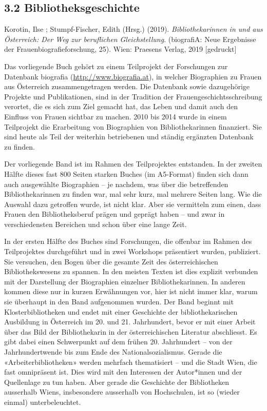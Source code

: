\documentclass[a4paper,
fontsize=11pt,
oneside,
numbers=noperiodatend,
parskip=half-,
bibliography=totoc,
final
]{scrartcl}
\begin{document}
\hypertarget{bibliotheksgeschichte}{%
\subsection{3.2 Bibliotheksgeschichte}\label{bibliotheksgeschichte}}

Korotin, Ilse ; Stumpf-Fischer, Edith (Hrsg.) (2019).
\emph{Bibliothekarinnen in und aus Österreich: Der Weg zur beruflichen
Gleichstellung}. (biografiA: Neue Ergebnisse der
Frauenbiografieforschung, 25). Wien: Praesens Verlag, 2019
{[}gedruckt{]}

Das vorliegende Buch gehört zu einem Teilprojekt der Forschungen zur
Datenbank biografia
(\href{http://www.biografia.at/}{http://www.biografia.at}), in welcher
Biographien zu Frauen aus Österreich zusammengetragen werden. Die
Datenbank sowie dazugehörige Projekte und Publikationen, sind in der
Tradition der Frauengeschichtsschreibung verortet, die es sich zum Ziel
gemacht hat, das Leben und damit auch den Einfluss von Frauen sichtbar
zu machen. 2010 bis 2014 wurde in einem Teilprojekt die Erarbeitung von
Biographien von Bibliothekarinnen finanziert. Sie sind heute als Teil
der weiterhin betriebenen und ständig ergänzten Datenbank zu finden.

Der vorliegende Band ist im Rahmen des Teilprojektes entstanden. In der
zweiten Hälfte dieses fast 800 Seiten starken Buches (im A5-Format)
finden sich dann auch ausgewählte Biographien -- je nachdem, was über
die betreffenden Bibliothekarinnen zu finden war, mal sehr kurz, mal
mehrere Seiten lang. Wie die Auswahl dazu getroffen wurde, ist nicht
klar. Aber sie vermitteln zum einen, dass Frauen den Bibliotheksberuf
prägen und geprägt haben -- und zwar in verschiedensten Bereichen und
schon über eine lange Zeit.

In der ersten Hälfte des Buches sind Forschungen, die offenbar im Rahmen
des Teilprojektes durchgeführt und in zwei Workshops präsentiert wurden,
publiziert. Sie versuchen, den Bogen über die gesamte Zeit des
österreichischen Bibliothekswesens zu spannen. In den meisten Texten ist
dies explizit verbunden mit der Darstellung der Biographien einzelner
Bibliothekarinnen. In anderen kommen diese nur in kurzen Erwähnungen
vor, hier ist nicht immer klar, warum sie überhaupt in den Band
aufgenommen wurden. Der Band beginnt mit Klosterbibliotheken und endet
mit einer Geschichte der bibliothekarischen Ausbildung in Österreich im
20. und 21. Jahrhundert, bevor er mit einer Arbeit über das Bild der
Bibliothekarin in der österreichischen Literatur abschliesst. Es gibt
dabei einen Schwerpunkt auf dem frühen 20. Jahrhundert -- von der
Jahrhundertwende bis zum Ende des Nationalsozialismus. Gerade die
«Arbeiterbibliotheken» werden mehrfach thematisiert -- und die Stadt
Wien, die fast omnipräsent ist. Dies wird mit den Interessen der
Autor*innen und der Quellenlage zu tun haben. Aber gerade die Geschichte
der Bibliotheken ausserhalb Wiens, insbesondere ausserhalb von
Hochschulen, ist so (wieder einmal) unterbeleuchtet.
\end{document}
